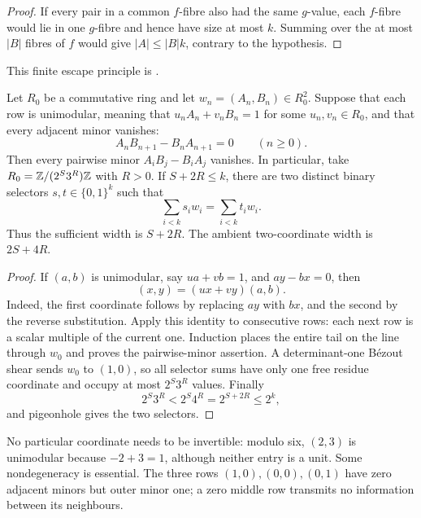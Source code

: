 \documentclass[11pt]{article}
\begin{document}
\begin{proof}
If every pair in a common $f$-fibre also had the same $g$-value, each
$f$-fibre would lie in one $g$-fibre and hence have size at most $k$.
Summing over the at most $|B|$ fibres of $f$ would give
$|A|\le |B|k$, contrary to the hypothesis.
\end{proof}

\noindent This finite escape principle is
.

\begin{theorem}
\label{long1049:res:plucker-collapse}
Let $R_0$ be a commutative ring and let $w_n=(A_n,B_n)\in R_0^2$.  Suppose
that each row is unimodular, meaning that $u_nA_n+v_nB_n=1$ for some
$u_n,v_n\in R_0$, and that every adjacent minor vanishes:
\[
 A_nB_{n+1}-B_nA_{n+1}=0\qquad(n\ge0).
\]
Then every pairwise minor $A_iB_j-B_iA_j$ vanishes.  In particular, take
$R_0=\mathbb{Z}/(2^S3^R)\mathbb{Z}$ with $R>0$.  If $S+2R\le k$, there are two distinct
binary selectors $s,t\in\{0,1\}^{k}$ such that
\[
 \sum_{i<k}s_iw_i=\sum_{i<k}t_iw_i.
\]
Thus the sufficient width is $S+2R$.  The ambient two-coordinate width is
$2S+4R$.
\end{theorem}

\begin{proof}
If $(a,b)$ is unimodular, say $ua+vb=1$, and $ay-bx=0$, then
\[
 (x,y)=(ux+vy)(a,b).
\]
Indeed, the first coordinate follows by replacing $ay$ with $bx$, and the
second by the reverse substitution.  Apply this identity to consecutive rows:
each next row is a scalar multiple of the current one.  Induction places the
entire tail on the line through $w_0$ and proves the pairwise-minor assertion.
A determinant-one B\'ezout shear sends $w_0$ to
$(1,0)$, so all selector sums have only one free residue coordinate and occupy
at most $2^S3^R$ values.  Finally
\[
 2^S3^R<2^S4^R=2^{S+2R}\le2^k,
\]
and pigeonhole gives the two selectors.
\end{proof}

\noindent No particular coordinate needs to be invertible: modulo six,
$(2,3)$ is unimodular because $-2+3=1$, although neither entry is a unit.
Some nondegeneracy is essential.  The three rows $(1,0),(0,0),(0,1)$ have
zero adjacent minors but outer minor one; a zero middle row transmits no
information between its neighbours.
\end{document}
